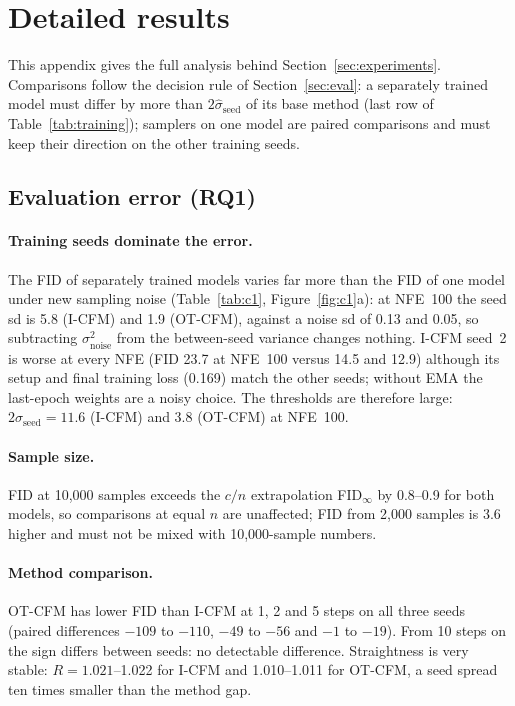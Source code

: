 \section{Detailed results}\label{app:extra}
This appendix gives the full analysis behind Section~\ref{sec:experiments}. Comparisons follow the decision rule of Section~\ref{sec:eval}: a separately trained model must differ by more than $2\hat\sigma_{\text{seed}}$ of its base method (last row of Table~\ref{tab:training}); samplers on one model are paired comparisons and must keep their direction on the other training seeds.

\subsection{Evaluation error (RQ1)}\label{app:c1}

\paragraph{Training seeds dominate the error.} The FID of separately trained models varies far more than the FID of one model under new sampling noise (Table~\ref{tab:c1}, Figure~\ref{fig:c1}a): at NFE~100 the seed sd is 5.8 (I-CFM) and 1.9 (OT-CFM), against a noise sd of 0.13 and 0.05, so subtracting $\sigma^2_{\text{noise}}$ from the between-seed variance changes nothing. I-CFM seed~2 is worse at every NFE (FID 23.7 at NFE~100 versus 14.5 and 12.9) although its setup and final training loss (0.169) match the other seeds; without EMA the last-epoch weights are a noisy choice. The thresholds are therefore large: $2\hat\sigma_{\text{seed}}=11.6$ (I-CFM) and 3.8 (OT-CFM) at NFE~100. %
\paragraph{Sample size.} FID at 10,000 samples exceeds the $c/n$ extrapolation FID$_\infty$ by 0.8--0.9 for both models, so comparisons at equal $n$ are unaffected; FID from 2,000 samples is 3.6 higher and must not be mixed with 10,000-sample numbers. %
\paragraph{Method comparison.} OT-CFM has lower FID than I-CFM at 1, 2 and 5 steps on all three seeds (paired differences $-109$ to $-110$, $-49$ to $-56$ and $-1$ to $-19$). From 10 steps on the sign differs between seeds: no detectable difference. Straightness is very stable: $R=1.021$--1.022 for I-CFM and 1.010--1.011 for OT-CFM, a seed spread ten times smaller than the method gap.
